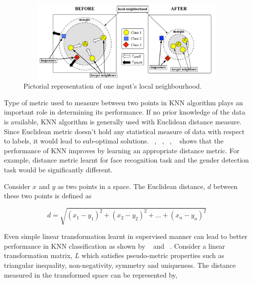 %
%
% 

\begin{figure}
    \centering
    \includegraphics[width=5in, height=1.6in]{concepts/figures/metric_learning_example.png}
    \caption{Pictorial representation of one input's local neighbourhood.}
    \label{fig:metric_learning_example}
\end{figure}

Type of metric used to measure between two points in KNN algorithm plays an important role 
in determining its performance. If no prior knowledge of the data is available, KNN algorithm
is generally used with Euclidean distance measure. Since Euclidean metric doesn't hold any
statistical measure of data with respect to labels, it would lead to sub-optimal solutions.
~\cite{Chopra:2005:LSM:1068507.1068961}, ~\cite{NIPS2004_2566}, ~\cite{Shalev-Shwartz:2004:OBL:1015330.1015376}, 
~\cite{Shental:2002:ALR:645318.649268} shows that the performance of KNN improves by 
learning an appropriate distance metric. For example, distance metric learnt for face recognition
task and the gender detection task would be significantly different.

Consider $x$ and $y$ as two points in a space. The Euclidean distance, $d$ between these two points is
defined as

\begin{equation}
    d = \sqrt{(x_1-y_1)^2 + (x_2-y_2)^2 + . . . + (x_n-y_n)^2} 
\end{equation}

Even simple linear transformation learnt in supervised manner can lead to better performance in KNN 
classification as shown by ~\cite{Shalev-Shwartz:2004:OBL:1015330.1015376} and ~\cite{NIPS2004_2566}.
Consider a linear transformation matrix, $L$ which satisfies pseudo-metric properties such as triangular 
inequality, non-negativity, symmetry and uniqueness. The distance measured in the transformed space 
can be represented by,

